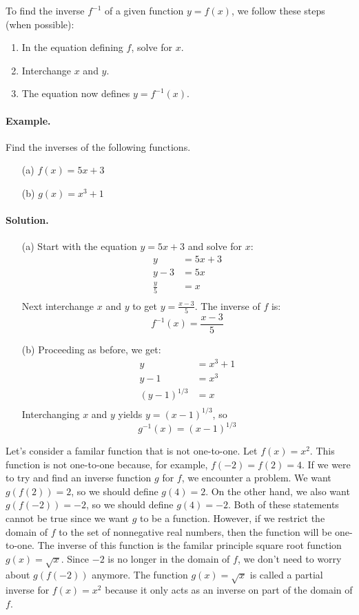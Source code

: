 \documentclass[12pt]{report}
\begin{document}
To find the inverse $f^{-1}$ of a given function $y=f(x)$, we follow these steps (when possible):
\begin{enumerate}
\item In the equation defining $f$, solve for $x$.
\item Interchange $x$ and $y$.
\item The equation now defines $y=f^{-1}(x)$.
\end{enumerate}

\paragraph{Example.} Find the inverses of the following functions.
\begin{itemize}
\item [(a)] $f(x)=5x+3$
\item [(b)] $g(x)=x^3+1$
\end{itemize}

\paragraph{Solution.} 
\begin{itemize}
\item [(a)] Start with the equation $y=5x+3$ and solve for $x$:
\begin{equation*}
\begin{split}
y&=5x+3\\
y-3&=5x\\
\frac{y}5 &=x\\
\end{split}
\end{equation*}
Next interchange $x$ and $y$ to get $\displaystyle y=\frac{x-3}5$. The inverse of $f$ is: \[ f^{-1}(x)=\frac{x-3}5 \]
\item [(b)] Proceeding as before, we get:
\begin{equation*}
\begin{split}
y&=x^3+1\\
y-1&=x^3\\
(y-1)^{1/3}&=x\\
\end{split}
\end{equation*}
Interchanging $x$ and $y$ yields $y=(x-1)^{1/3}$, so \[g^{-1}(x)=(x-1)^{1/3}\]
\end{itemize}

Let's consider a familar function that is not one-to-one. Let $f(x)=x^2$. This function is not one-to-one because, for example, $f(-2)=f(2)=4$. If we were to try and find an inverse function $g$ for $f$, we encounter a problem. We want $g(f(2))=2$, so we should define $g(4)=2$. On the other hand, we also want $g(f(-2))=-2$, so we should define $g(4)=-2$. Both of these statements cannot be true since we want $g$ to be a function. However, if we restrict the domain of $f$ to the set of nonnegative real numbers, then the function will be one-to-one. The inverse of this function is the familar principle square root function $g(x)=\sqrt x$. Since $-2$ is no longer in the domain of $f$, we don't need to worry about $g(f(-2))$ anymore. The function $g(x)=\sqrt x$ is called a partial inverse for $f(x)=x^2$ because it only acts as an inverse on part of the domain of $f$.
\end{document}
